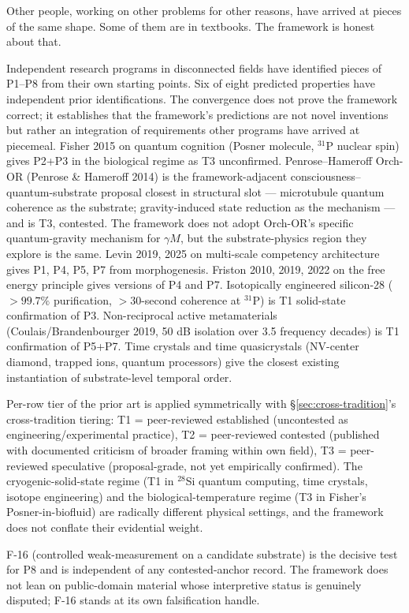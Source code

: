 \documentclass[11pt,a4paper]{article}
\begin{document}
Other people, working on other problems for other reasons, have arrived at pieces of the same shape. Some of them are in textbooks. The framework is honest about that.

Independent research programs in disconnected fields have identified pieces of P1--P8 from their own starting points. Six of eight predicted properties have independent prior identifications. The convergence does not prove the framework correct; it establishes that the framework's predictions are not novel inventions but rather an integration of requirements other programs have arrived at piecemeal. Fisher 2015 on quantum cognition (Posner molecule, $^{31}$P nuclear spin) gives P2+P3 in the biological regime as T3 unconfirmed. Penrose--Hameroff Orch-OR (Penrose \& Hameroff 2014) is the framework-adjacent consciousness--quantum-substrate proposal closest in structural slot --- microtubule quantum coherence as the substrate; gravity-induced state reduction as the mechanism --- and is T3, contested. The framework does not adopt Orch-OR's specific quantum-gravity mechanism for $\gamma M$, but the substrate-physics region they explore is the same. Levin 2019, 2025 on multi-scale competency architecture gives P1, P4, P5, P7 from morphogenesis. Friston 2010, 2019, 2022 on the free energy principle gives versions of P4 and P7. Isotopically engineered silicon-28 ($> 99.7\%$ purification, $> 30$-second coherence at $^{31}$P) is T1 solid-state confirmation of P3. Non-reciprocal active metamaterials (Coulais/Brandenbourger 2019, 50 dB isolation over 3.5 frequency decades) is T1 confirmation of P5+P7. Time crystals and time quasicrystals (NV-center diamond, trapped ions, quantum processors) give the closest existing instantiation of substrate-level temporal order.

Per-row tier of the prior art is applied symmetrically with \S\ref{sec:cross-tradition}'s cross-tradition tiering: T1 = peer-reviewed established (uncontested as engineering/experimental practice), T2 = peer-reviewed contested (published with documented criticism of broader framing within own field), T3 = peer-reviewed speculative (proposal-grade, not yet empirically confirmed). The cryogenic-solid-state regime (T1 in $^{28}$Si quantum computing, time crystals, isotope engineering) and the biological-temperature regime (T3 in Fisher's Posner-in-biofluid) are radically different physical settings, and the framework does not conflate their evidential weight.

F-16 (controlled weak-measurement on a candidate substrate) is the decisive test for P8 and is independent of any contested-anchor record. The framework does not lean on public-domain material whose interpretive status is genuinely disputed; F-16 stands at its own falsification handle.
\end{document}
